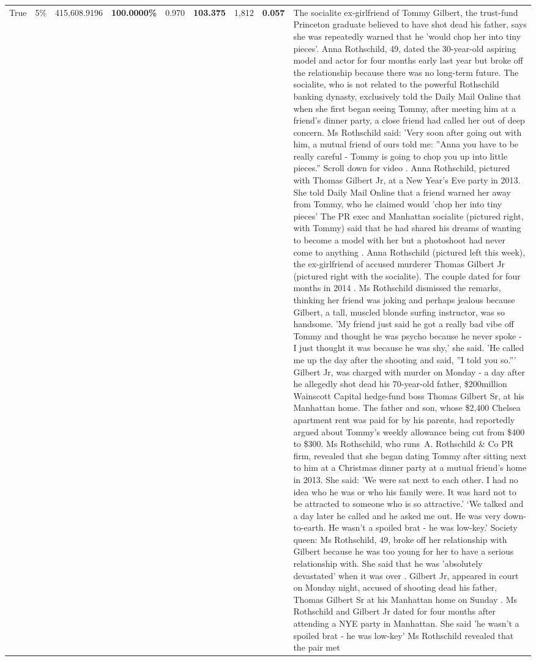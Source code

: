 \begin{table}[H]
\begin{tabular}{lllrlllll}
True & 5\% & 415,608.9196 & \bfseries \color{red} 100.0000\% & 0.970 & \bfseries \color{red} 103.375 & 1,812 & \bfseries \color{red} 0.057 & The socialite ex-girlfriend of Tommy Gilbert, the trust-fund Princeton graduate believed to have shot dead his father, says she was repeatedly warned that he 'would chop her into tiny pieces'. Anna Rothschild, 49, dated the 30-year-old aspiring model and actor for four months early last year but broke off the relationship because there was no long-term future. The socialite, who is not related to the powerful Rothschild banking dynasty, exclusively told the Daily Mail Online that when she first began seeing Tommy, after meeting him at a friend's dinner party, a close friend had called her out of deep concern. Ms Rothschild said: 'Very soon after going out with him, a mutual friend of ours told me: ''Anna you have to be really careful - Tommy is going to chop you up into little pieces.'' Scroll down for video . Anna Rothschild, pictured with Thomas Gilbert Jr, at a New Year's Eve party in 2013. She told Daily Mail Online that a friend warned her away from Tommy, who he claimed would 'chop her into tiny pieces' The PR exec and Manhattan socialite (pictured right, with Tommy) said that he had shared his dreams of wanting to become a model with her but a photoshoot had never come to anything . Anna Rothschild (pictured left this week), the ex-girlfriend of accused murderer Thomas Gilbert Jr (pictured right with the socialite). The couple dated for four months in 2014 . Ms Rothschild dismissed the remarks, thinking her friend was joking and perhaps jealous because Gilbert, a tall, muscled blonde surfing instructor, was so handsome. 'My friend just said he got a really bad vibe off Tommy and thought he was psycho because he never spoke - I just thought it was because he was shy,' she said. 'He called me up the day after the shooting and said, ''I told you so.''' Gilbert Jr, was charged with murder on Monday - a day after he allegedly shot dead his 70-year-old father, \$200million Wainscott Capital hedge-fund boss Thomas Gilbert Sr, at his Manhattan home. The father and son, whose \$2,400 Chelsea apartment rent was paid for by his parents, had reportedly argued about Tommy's weekly allowance being cut from \$400 to \$300. Ms Rothschild, who runs A. Rothschild \& Co PR firm, revealed that she began dating Tommy after sitting next to him at a Christmas dinner party at a mutual friend's home in 2013. She said: 'We were sat next to each other. I had no idea who he was or who his family were. It was hard not to be attracted to someone who is so attractive.' ‘We talked and a day later he called and he asked me out. He was very down-to-earth. He wasn’t a spoiled brat - he was low-key.’ Society queen: Ms Rothschild, 49, broke off her relationship with Gilbert because he was too young for her to have a serious relationship with. She said that he was 'absolutely devastated' when it was over . Gilbert Jr, appeared in court on Monday night, accused of shooting dead his father, Thomas Gilbert Sr at his Manhattan home on Sunday . Ms Rothschild and Gilbert Jr dated for four months after attending a NYE party in Manhattan. She said 'he wasn't a spoiled brat - he was low-key' Ms Rothschild revealed that the pair met 
\end{tabular}
\end{table}
